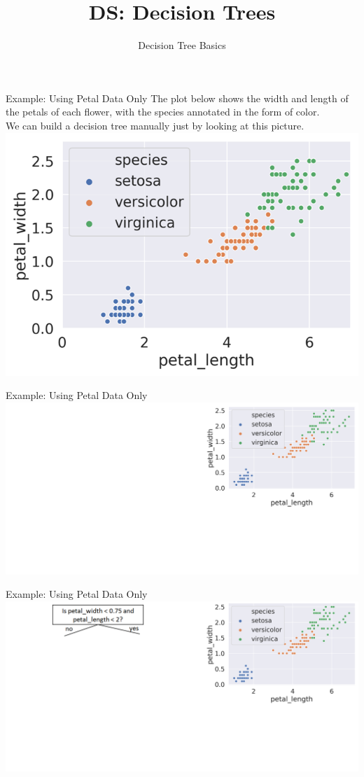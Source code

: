 \documentclass[aspectratio=169]{../latex_main/tntbeamer}  %
\title[Introduction]{DS: Decision Trees}
\subtitle{Decision Tree Basics}
\begin{document}
	
	\maketitle
	\begin{frame}{Example: Using Petal Data Only}
	    The plot below shows the width and length of the petals of each flower, with the species annotated in the form of color.\\
	    \bigskip
	    We can build a decision tree manually just by looking at this picture.
	        \centering
	        \includegraphics[scale=.65]{Bild3}

	\end{frame}
	
	\begin{frame}{Example: Using Petal Data Only}
	        \includegraphics[scale=.34]{Bild5}
	\end{frame}
	
	
	\begin{frame}{Example: Using Petal Data Only}
	        \includegraphics[scale=.34]{Bild6}
	\end{frame}
	
\end{document}
